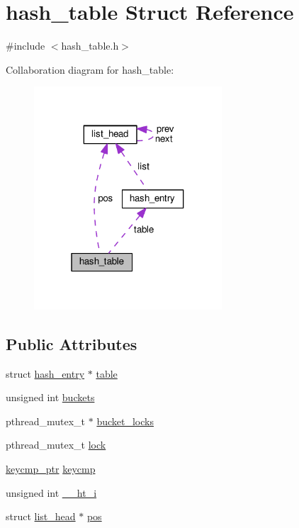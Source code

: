 \hypertarget{structhash__table}{}\section{hash\+\_\+table Struct Reference}
\label{structhash__table}


{\ttfamily \#include $<$hash\+\_\+table.\+h$>$}



Collaboration diagram for hash\+\_\+table\+:\nopagebreak
\begin{figure}[H]
\begin{center}
\leavevmode
\includegraphics[width=199pt]{structhash__table__coll__graph}
\end{center}
\end{figure}
\subsection*{Public Attributes}
\begin{DoxyCompactItemize}
\item 
struct \hyperlink{structhash__entry}{hash\+\_\+entry} $\ast$ \hyperlink{structhash__table_a04cd18d2fc0ace3527670ceca050492b}{table}
\item 
unsigned int \hyperlink{structhash__table_a4678419b52c36e8b949b17eb4843a420}{buckets}
\item 
pthread\+\_\+mutex\+\_\+t $\ast$ \hyperlink{structhash__table_a4148c7a0d18b24d1c2961564dc0e7e7a}{bucket\+\_\+locks}
\item 
pthread\+\_\+mutex\+\_\+t \hyperlink{structhash__table_af4cefababf047c699eca5f45f8d4284e}{lock}
\item 
\hyperlink{util_2hash__table_8h_a9b0a83bb52986ea61f0e4351b66d41ef}{keycmp\+\_\+ptr} \hyperlink{structhash__table_a9465a319f391f0a50a4a84362c40fe48}{keycmp}
\item 
unsigned int \hyperlink{structhash__table_a77da69e21124ac1097627ae23ae72ef5}{\+\_\+\+\_\+ht\+\_\+i}
\item 
struct \hyperlink{structlist__head}{list\+\_\+head} $\ast$ \hyperlink{structhash__table_af9bcc20e562a8a4f6dd37aaa543a3883}{pos}
\end{DoxyCompactItemize}


